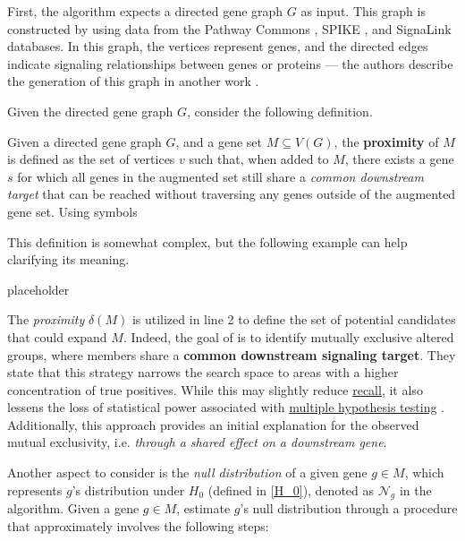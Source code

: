 First, the algorithm expects a directed gene graph $G$ as input. This graph is constructed by \textcite{mutex} using data from the Pathway Commons \cite{pathway-commons}, SPIKE \cite{spike}, and SignaLink \cite{signalink} databases. In this graph, the vertices represent genes, and the directed edges indicate signaling relationships between genes or proteins --- the authors describe the generation of this graph in another work \cite{g-gen}.

Given the directed gene graph $G$, consider the following definition.

\begin{definition}[Proximity] \label{proximity}
    Given a directed gene graph $G$, and a gene set $M \subseteq V(G)$, the \textbf{proximity} of $M$ is defined as the set of vertices $v$ such that, when added to $M$, there exists a gene $s$ for which all genes in the augmented set still share a \textit{common downstream target} that can be reached without traversing any genes outside of the augmented gene set. Using symbols 
\end{definition}

This definition is somewhat complex, but the following example \cite{mutex} can help clarifying its meaning.

\begin{example}[Proximity]
    placeholder 
\end{example}

The \textit{proximity} $\delta(M)$ is utilized in line 2 to define the set of potential candidates that could expand $M$. Indeed, the goal of \textcite{mutex} is to identify mutually exclusive altered groups, where members share a \textbf{common downstream signaling target}. They state that this strategy narrows the search space to areas with a higher concentration of true positives. While this may slightly reduce \href{https://en.wikipedia.org/wiki/Precision_and_recall}{recall}, it also lessens the loss of statistical power associated with \href{https://en.wikipedia.org/wiki/Multiple_comparisons_problem}{multiple hypothesis testing} . Additionally, this approach provides an initial explanation for the observed mutual exclusivity, i.e. \textit{through a shared effect on a downstream gene}.

Another aspect to consider is the \textit{null distribution} of a given gene $g \in M$, which represents $g$'s distribution under $H_0$ (defined in \cref{H_0}), denoted as $\mathcal N_g$ in the algorithm. Given a gene $g \in M$, \textcite{mutex} estimate $g$'s null distribution through a procedure that approximately involves the following steps:


